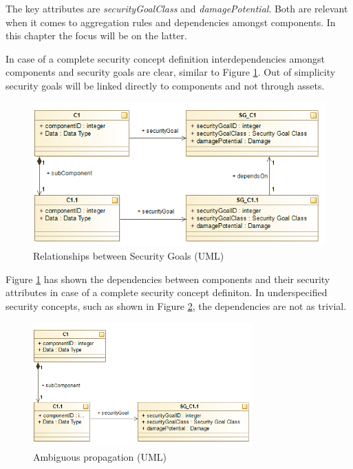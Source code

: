 The key attributes are \textit{securityGoalClass} and \textit{damagePotential}. Both are relevant when it comes to aggregation rules and dependencies amongst components. In this chapter the focus will be on the latter.

In case of a complete security concept definition interdependencies amongst components and security goals are clear, similar to Figure \ref{fig:subcomponent}. Out of simplicity security goals will be linked directly to components and not through assets.

\begin{figure}[H]
\centering
\includegraphics[scale=0.75]{pictures/rel_component.png}
\caption{Relationships between Security Goals (UML)}
\label{fig:subcomponent}
\end{figure} 

Figure \ref{fig:subcomponent} has shown the dependencies between components and their security attributes in case of a complete security concept definiton. In underspecified security concepts, such as shown in Figure \ref{fig:subcomponent_dilemma}, the dependencies are not as trivial. 

\begin{figure}[H]
\centering
\includegraphics[width=0.75\textwidth]{pictures/sg_dilemma_no_goal.png}
\caption{Ambiguous propagation (UML)}
\label{fig:subcomponent_dilemma}
\end{figure} 

